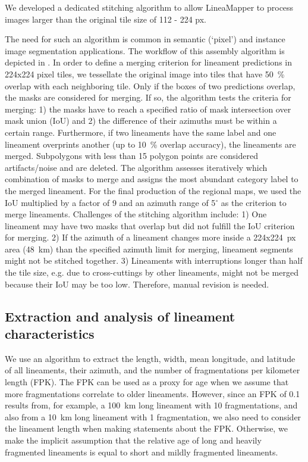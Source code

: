 We developed a dedicated stitching algorithm to allow LineaMapper to process images larger than the original tile size of 112 - 224 px.

The need for such an algorithm is common in semantic (`pixel') and instance image segmentation applications.  %
The workflow of this assembly algorithm is depicted in . In order to define a merging criterion for lineament predictions in 224x224 pixel tiles, we tessellate the original image into tiles that have 50~\% overlap with each neighboring tile. 
Only if the boxes of two predictions overlap, the masks are considered for merging. If so, the algorithm tests the criteria for merging: 1) the masks have to reach a specified ratio of mask intersection over mask union (IoU) and 2) the difference of their azimuths must be within a certain range. Furthermore, if two lineaments have the same label and one lineament overprints another (up to 10~\% overlap accuracy), the lineaments are merged. Subpolygons with less than 15 polygon points are considered artifacts/noise and are deleted. The algorithm assesses iteratively which combination of masks to merge and assigns the most abundant category label to the merged lineament. For the final production of the regional maps, we used the IoU multiplied by a factor of 9 and an azimuth range of 5$^{\circ}$ as the criterion to merge lineaments.
Challenges of the stitching algorithm include: 1) One lineament may have two masks that overlap but did not fulfill the IoU criterion for merging. 2) If the azimuth of a lineament changes more inside a 224x224~px area (48~km) than the specified azimuth limit for merging, lineament segments might not be stitched together. 3) Lineaments with interruptions longer than half the tile size, e.g. due to cross-cuttings by other lineaments, might not be merged because their IoU may be too low. Therefore, manual revision is needed. 

\subsection{Extraction and analysis of lineament characteristics}\label{Sect_extraction_algo}
We use an algorithm to extract the length, width, mean longitude, and latitude of all lineaments, their azimuth, and the number of fragmentations per kilometer length (FPK). The FPK can be used as a proxy for age when we assume that more fragmentations correlate to older lineaments. However, since an FPK of 0.1 results from, for example, a 100~km long lineament with 10 fragmentations, and also from a 10~km long lineament with 1 fragmentation, we also need to consider the lineament length when making statements about the FPK. Otherwise, we make the implicit assumption that the relative age of long and heavily fragmented lineaments is equal to short and mildly fragmented lineaments.

